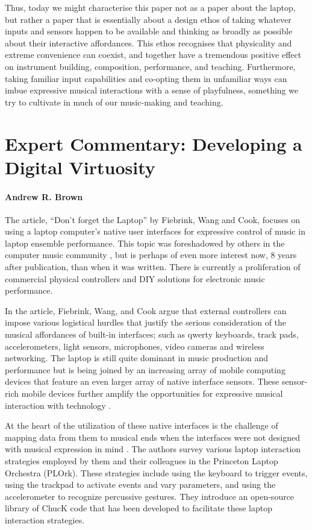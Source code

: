 Thus, today we might characterise this paper not as a paper about the laptop, but rather a paper that is essentially about a design ethos of taking whatever inputs and sensors happen to be available and thinking as broadly as possible about their interactive affordances. This ethos recognises that physicality and extreme convenience can coexist, and together have a tremendous positive effect on instrument building, composition, performance, and teaching. Furthermore, taking familiar input capabilities and co-opting them in unfamiliar ways can imbue expressive musical interactions with a sense of playfulness, something we try to cultivate in much of our music-making and teaching.

\section*{Expert Commentary: Developing a Digital Virtuosity}
\paragraph{Andrew R. Brown}

The article, ``Don't forget the Laptop'' by Fiebrink, Wang and Cook, focuses on using a laptop computer's native user interfaces for expressive control of music in laptop ensemble performance. This topic was foreshadowed by others in the computer music community \cite{Schiemer:2005}, but is perhaps of even more interest now, 8 years after publication, than when it was written. There is currently a proliferation of commercial physical controllers and DIY solutions for electronic music performance. 

In the article, Fiebrink, Wang, and Cook argue that external controllers can impose various logistical hurdles that justify the serious consideration of the musical affordances of built-in interfaces; such as qwerty keyboards, track pads, accelerometers, light sensors, microphones, video cameras and wireless networking. The laptop is still quite dominant in music production and performance but is being joined by an increasing array of mobile computing devices that feature an even larger array of native interface sensors. These sensor-rich mobile devices further amplify the opportunities for expressive musical interaction with technology \cite{Tanaka:2012}.

At the heart of the utilization of these native interfaces is the challenge of mapping data from them to musical ends when the interfaces were not designed with musical expression in mind \cite{Hunt:2003}. The authors survey various laptop interaction strategies employed by them and their colleagues in the Princeton Laptop Orchestra (PLOrk). These strategies include using the keyboard to trigger events, using the trackpad to activate events and vary parameters, and using the accelerometer to recognize percussive gestures. They introduce an open-source library of ChucK code that has been developed to facilitate these laptop interaction strategies.

